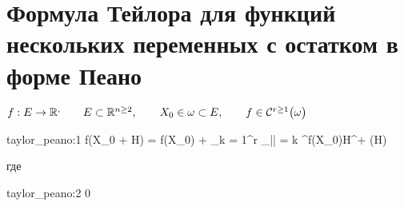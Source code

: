 \section{Формула Тейлора для функций нескольких переменных с остатком в форме Пеано}

\begin{theorem}
	$ f : E \to \R^, \qquad E \sub \R^{n \ge 2}, \qquad X_0 \in \omega \sub E, \qquad f \in \Cont[r \ge 1]{\omega} $
	\begin{equ}{taylor_peano:1}
		\implies f(X_0 + H) = f(X_0) + \sum_{k = 1}^r \sum_{|\alpha| = k}  \partial^\alpha f(X_0)H^\alpha + \rho(H)
	\end{equ}
	где
	\begin{equ}{taylor_peano:2}
		  0
	\end{equ}
\end{theorem}

